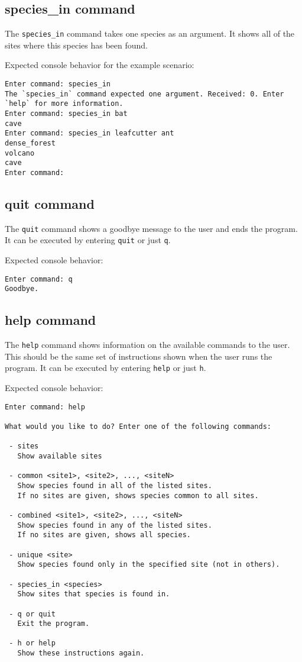 \documentclass[12pt,letterpaper]{article}
\begin{document}
\subsection{species\_in command}
The \texttt{species\_in} command takes one species as an argument. It shows all of the sites where this species has been found.

Expected console behavior for the example scenario:
\begin{lstlisting}
Enter command: species_in
The `species_in` command expected one argument. Received: 0. Enter `help` for more information.
Enter command: species_in bat
cave
Enter command: species_in leafcutter ant
dense_forest
volcano
cave
Enter command: 
\end{lstlisting}

\subsection{quit command}
The \texttt{quit} command shows a goodbye message to the user and ends the program. It can be executed by entering \texttt{quit} or just \texttt{q}.

Expected console behavior:
\begin{lstlisting}
Enter command: q
Goodbye.
\end{lstlisting}

\subsection{help command}
The \texttt{help} command shows information on the available commands to the user. This should be the same set of instructions shown when the user runs the program. It can be executed by entering \texttt{help} or just \texttt{h}.

Expected console behavior:
\begin{lstlisting}
Enter command: help

What would you like to do? Enter one of the following commands:

 - sites
   Show available sites

 - common <site1>, <site2>, ..., <siteN>  
   Show species found in all of the listed sites.  
   If no sites are given, shows species common to all sites.

 - combined <site1>, <site2>, ..., <siteN>  
   Show species found in any of the listed sites.  
   If no sites are given, shows all species.

 - unique <site>  
   Show species found only in the specified site (not in others).

 - species_in <species>
   Show sites that species is found in.

 - q or quit  
   Exit the program.

 - h or help  
   Show these instructions again.
\end{lstlisting}
\end{document}
